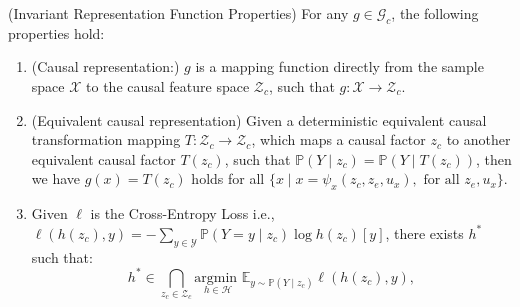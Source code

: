 \begin{corollary} \label{cor:proterties}(Invariant Representation Function Properties) For any \(g \in \mathcal{G}_c\), the following properties hold:
\begin{enumerate}
    \item(Causal representation:) \(g\) is a mapping function directly from the sample space \(\mathcal{X}\) to the causal feature space \(\mathcal{Z}_c\), such that \(g: \mathcal{X} \rightarrow \mathcal{Z}_c\).
    \item (Equivalent causal representation) Given a deterministic equivalent causal transformation mapping \(T: \mathcal{Z}_c \rightarrow \mathcal{Z}_c\), which maps a causal factor \(z_c\) to another equivalent causal factor \(T(z_c)\), such that
 $\mathbb{P}(Y\mid z_c)=\mathbb{P}(Y\mid T(z_c))$, then we have \(g(x) = T(z_c)\) holds for all \(\{x \mid x = \psi_x(z_c, z_e, u_x), \text{ for all } z_e, u_x\}\).

\item Given $\ell$ is the Cross-Entropy Loss i.e., $\ell(h(z_c), y) = -\sum_{y \in \mathcal{Y}} \mathbb{P}(Y = y \mid z_c) \log h(z_c)[y]$, there exists $h^*$ such that:
\begin{equation*}
  h^* \in\bigcap_{z_c\in\mathcal{Z}_c} \underset{h\in \mathcal{H}}{\text{argmin }} \mathbb{E}_{y\sim\mathbb{P}(Y\mid z_c)} \ell\left ( h( z_c), y \right ),  
\end{equation*}
\end{enumerate}
\end{corollary}
\color{black}
